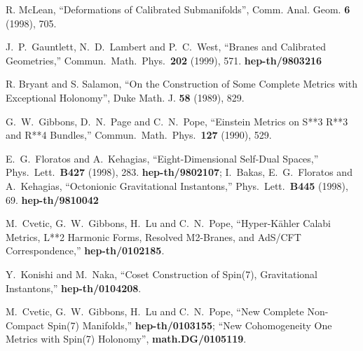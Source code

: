 \documentclass[12pt,a4paper]{article}
\begin{document}
\begin{thebibliography}{99}
 R. McLean, ``Deformations of Calibrated Submanifolds'', 
Comm. Anal. Geom. {\bf 6} (1998), 705.

 J.~P.~Gauntlett, N.~D.~Lambert and P.~C.~West,
``Branes and Calibrated Geometries,''
Commun.\ Math.\ Phys.\  {\bf 202} (1999), 571. {\bf hep-th/9803216}

 R. Bryant and S. Salamon, ``On the Construction of Some Complete Metrics with 
Exceptional Holonomy'', Duke Math. J. {\bf 58} (1989), 829.

 G.~W.~Gibbons, D.~N.~Page and C.~N.~Pope,
``Einstein Metrics on S**3 R**3 and R**4 Bundles,''
Commun.\ Math.\ Phys.\  {\bf 127} (1990), 529.

 E.~G.~Floratos and A.~Kehagias,
``Eight-Dimensional Self-Dual Spaces,''
Phys.\ Lett.\ {\bf B427} (1998), 283. {\bf hep-th/9802107}; 
I.~Bakas, E.~G.~Floratos and A.~Kehagias,
``Octonionic Gravitational Instantons,''
Phys.\ Lett.\ {\bf B445} (1998), 69. {\bf hep-th/9810042}

 M.~Cvetic, G.~W.~Gibbons, H.~Lu and C.~N.~Pope,
``Hyper-K\"ahler Calabi Metrics, L**2 Harmonic Forms, Resolved M2-Branes, 
and AdS\coordHE{}/CFT\coordHE{} Correspondence,'' {\bf hep-th/0102185}.

 Y.~Konishi and M.~Naka,
``Coset Construction of Spin(7), \coordHE{} Gravitational Instantons,''
{\bf hep-th/0104208}.

 M.~Cvetic, G.~W.~Gibbons, H.~Lu and C.~N.~Pope,
``New Complete Non-Compact Spin(7) Manifolds,'' {\bf hep-th/0103155}; 
``New Cohomogeneity One Metrics with Spin(7) Holonomy'', {\bf math.DG/0105119}.



\end{thebibliography}
\end{document}
